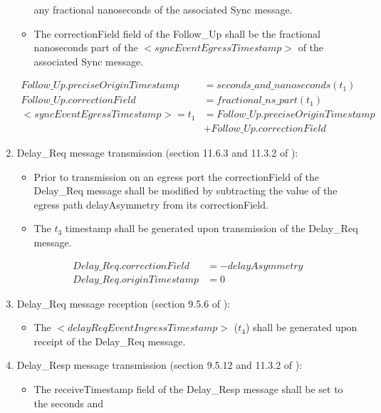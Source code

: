 \documentclass[a4paper, 12pt]{article}
\begin{document}
\begin{enumerate}
\begin{itemize}
	    any fractional nanoseconds of the associated Sync message.
      \item The correctionField field of the Follow\_Up shall be the fractional nanoseconds part of 
	    the $<syncEventEgressTimestamp>$ of the associated Sync message.
    \end{itemize}
	\begin{align}
	  \label{eq:follow_up_tx}
	  Follow\_Up.preciseOriginTimestamp &= seconds\_and\_nanoseconds(t_1)\\
	  Follow\_Up.correctionField &=  fractional\_ns\_part(t_1)\\
	  <syncEventEgressTimestamp>= t_1 &= Follow\_Up.preciseOriginTimestamp \\
		\nonumber	     &+ Follow\_Up.correctionField
	\end{align}
  \item Delay\_Req message transmission (section 11.6.3 and 11.3.2 of \cite{IEEE1588}):
    \begin{itemize}
      \item Prior to transmission on an egress port the correctionField of 
	    the Delay\_Req message shall be modified by subtracting the value of the egress 
	    path delayAsymmetry from its correctionField.
      \item The $t_3$ timestamp shall be generated upon transmission of the Delay\_Req message.
    \end{itemize}
	  \begin{align}
	    \label{eq:follow_up_rx}
	    Delay\_Req.correctionField &= -delayAsymmetry \\
	    Delay\_Req.originTimestamp &= 0
	  \end{align}
  \item Delay\_Req message reception (section 9.5.6 of \cite{IEEE1588}):
    \begin{itemize}
      \item The $<delayReqEventIngressTimestamp>$ ($t_4$)  
	    shall be generated upon receipt of the Delay\_Req message.
    \end{itemize}
  \item Delay\_Resp message transmission (section 9.5.12 and 11.3.2 of \cite{IEEE1588}):
    \begin{itemize}
      \item The receiveTimestamp field of the Delay\_Resp message shall be set to the seconds and 

\end{itemize}
\end{enumerate}
\end{document}
